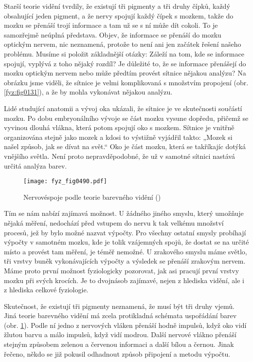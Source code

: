    Starší teorie vidění tvrdily, že existují tři pigmenty a tři druhy čípků, každý obsahující jeden
    pigment, a že nervy spojují každý čípek s mozkem, takže do mozku se přenáší trojí informace a
    tam už se s ní může dít cokoli. To je samozřejmě neúplná představa. Objev, že informace se
    přenáší do mozku optickým nervem, nic neznamená, protože to není ani jen začátek řešení našeho
    problému. Musíme si položit základnější otázky: Záleží na tom, kde se informace spojují, vyplývá
    z toho nějaký rozdíl? Je důležité to, že se informace přenášejí do mozku optickým nervem nebo
    může předtím provést sítnice nějakou analýzu? Na obrázku jsme viděli, že sítnice je velmi
    komplikovaná s množstvím propojení (obr. \ref {fyz:fig0131}), a že by mohla vykonávat nějakou
    analýzu.
    
    Lidé studující anatomii a vývoj oka ukázali, že sítnice je ve skutečnosti součástí mozku. Po
    dobu embryonálního vývoje se část mozku vysune dopředu, přičemž se vyvinou dlouhá vlákna, která
    potom spojují oko s mozkem. Sítnice je vnitřně organizována stejně jako mozek a kdosi to
    výstižně vyjádřil takto: „Mozek si našel způsob, jak se dívat na svět.“ Oko je část mozku, která
    se takříkajíc dotýká vnějšího světla. Není proto nepravděpodobné, že už v samotné sítnici
    nastává určitá analýza barev.

    \begin{figure}[ht!] %
      \centering
      \texttt{[image: fyz\_fig0490.pdf]}
      \caption{Nervovéspoje podle  teorie barevného vidění (\cite[s.~697]{Feynman01})}
      \label{fyz:fig0490}
    \end{figure}

    Tím se nám nabízí zajímavá možnost. U žádného jiného smyslu, který umožňuje nějaká měření,
    nedochází před vstupem do nervu k tak velkému množství procesů, jež by bylo možné nazvat
    výpočty. Pro všechny ostatní smysly probíhají výpočty v samotném mozku, kde je tolik vzájemných
    spojů, že dostat se na určité místo a provést tam měření, je téměř nemožné. U zrakového smyslu
    máme světlo, tři vrstvy buněk vykonávajících výpočty a výsledek se přenáší zrakovým nervem. Máme
    proto první možnost fyziologicky pozorovat, jak asi pracují první vrstvy mozku při svých
    krocích. Je to dvojnásob zajímavé, nejen z hlediska vidění, ale i z hlediska celkové fyziologie.

    Skutečnost, že existují tři pigmenty neznamená, že musí být tři druhy vjemů. Jiná teorie
    barevného vidění má zcela protikladná schémata uspořádání barev (obr. \ref{fyz:fig0490}). Podle
    ní jedno z nervových vláken přenáší hodně impulsů, když oko vidí žlutou barvu a málo impulsů,
    když vidí modrou. Další nervové vlákno přenáší stejným způsobem zelenou a červenou informaci a
    další bílou a černou. Jinak řečeno, někdo se již pokusil odhadnout způsob připojení a metodu
    výpočtu.


